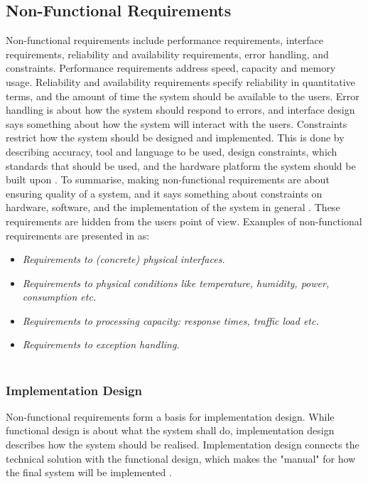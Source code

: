 \subsection{Non-Functional Requirements}
Non-functional requirements include performance requirements, interface requirements, reliability and availability requirements, error handling, and constraints. Performance requirements address speed, capacity and memory usage. Reliability and availability requirements specify reliability in quantitative terms, and the amount of time the system should be available to the users. Error handling is about how the system should respond to errors, and interface design says something about how the system will interact with the users. Constraints restrict how the system should be designed and implemented. This is done by describing accuracy, tool and language to be used, design constraints, which standards that should be used, and the hardware platform the system should be built upon \cite{braude2000software}. To summarise, making non-functional requirements are about ensuring quality of a system, and it says something about constraints on hardware, software, and the implementation of the system in general \cite{mmi}. These requirements are hidden from the users point of view. Examples of non-functional requirements are presented in \cite{systemutviklingDel1} as:
\begin{itemize}
\item \emph{Requirements to (concrete) physical interfaces.}
\item \emph{Requirements to physical conditions like temperature, humidity, power, consumption etc.}
\item \emph{Requirements to processing capacity: response times, traffic load etc.}
\item \emph{Requirements to exception handling.} \\ \\ 
\end{itemize}   

\subsubsection{Implementation Design}
Non-functional requirements form a basis for implementation design. While functional design is about what the system shall do, implementation design describes how the system should be realised. Implementation design connects the technical solution with the functional design, which makes the "manual" for how the final system will be implemented \cite{systemutviklingDel1}.  

